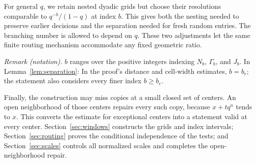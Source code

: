 For general $q$, we retain nested dyadic grids but choose their
resolutions comparable to $q^{-b}/(1-q)$ at index $b$. This gives
both the nesting needed to preserve earlier decisions and the
separation needed for fresh random entries. The branching number is
allowed to depend on $q$. These two adjustments let the same finite
routing mechanism accommodate any fixed geometric ratio.

\noindent\textit{Remark (notation).} $b$ ranges over the positive integers indexing $N_b$, $\Gamma_b$, and $J_b$. In Lemma~\ref{lem:separation}: In the proof's distance and cell-width estimates, $b=b_e$; the statement also considers every finer index $b\ge b_e$.


Finally, the construction may miss copies at a small closed set of
centers. An open neighborhood of those centers repairs every such
copy, because $x+tq^n$ tends to $x$. This converts the estimate for
exceptional centers into a statement valid at every center.
Section~\ref{sec:windows} constructs the grids and index intervals;
Section~\ref{sec:routing} proves the conditional independence of the
tests; and Section~\ref{sec:scales} controls all normalized scales
and completes the open-neighborhood repair.
